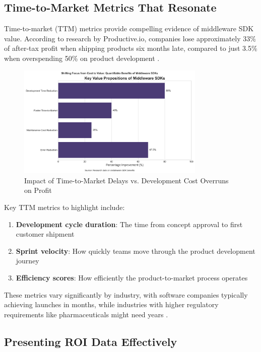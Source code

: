\documentclass[11pt,a4paper]{article}
\begin{document}
\subsection{Time-to-Market Metrics That Resonate}

Time-to-market (TTM) metrics provide compelling evidence of middleware SDK value. According to research by Productive.io, companies lose approximately 33\% of after-tax profit when shipping products six months late, compared to just 3.5\% when overspending 50\% on product development \cite{productive2023}.

\begin{figure}[htbp]
    \centering
    \includegraphics[width=0.8\textwidth]{figures/visualization-20250510125949.png}
    \caption{Impact of Time-to-Market Delays vs. Development Cost Overruns on Profit}
    \label{fig:ttm-impact}
\end{figure}

Key TTM metrics to highlight include:

\begin{enumerate}
    \item \textbf{Development cycle duration}: The time from concept approval to first customer shipment
    \item \textbf{Sprint velocity}: How quickly teams move through the product development journey
    \item \textbf{Efficiency scores}: How efficiently the product-to-market process operates
\end{enumerate}

These metrics vary significantly by industry, with software companies typically achieving launches in months, while industries with higher regulatory requirements like pharmaceuticals might need years \cite{enkonix2023}.

\subsection{Presenting ROI Data Effectively}
\end{document}
